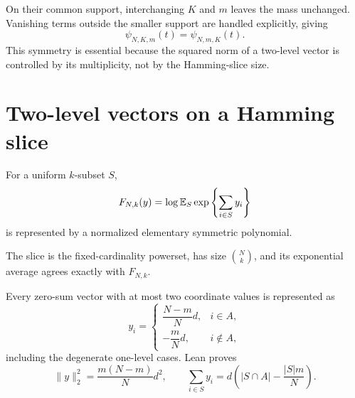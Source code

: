 \begin{lemma}
\label{lem:hypergeom-symmetry}
On their common support, interchanging \(K\) and \(m\) leaves the mass
unchanged.  Vanishing terms outside the smaller support are handled explicitly,
giving
\[
  \psi_{N,K,m}(t)=\psi_{N,m,K}(t).
\]
This symmetry is essential because the squared norm of a two-level vector is
controlled by its multiplicity, not by the Hamming-slice size.
\end{lemma}

\section{Two-level vectors on a Hamming slice}

\begin{definition}
For a uniform \(k\)-subset \(S\),
\[
  F_{N,k}(y)=\log\mathbb{E}_S\exp\left\{\sum_{i\in S}y_i\right\}
\]
is represented by a normalized elementary symmetric polynomial.
\end{definition}

\begin{lemma}
The slice is the fixed-cardinality powerset, has size \(\binom Nk\), and its
exponential average agrees exactly with \(F_{N,k}\).
\end{lemma}

\begin{lemma}
\label{lem:two-level-representation}
Every zero-sum vector with at most two coordinate values is represented as
\[
  y_i=\begin{cases}
    \dfrac{N-m}{N}d,&i\in A,\\[4pt]
    -\dfrac mN d,&i\notin A,
  \end{cases}
\]
including the degenerate one-level cases.  Lean proves
\[
  \|y\|_2^2=\frac{m(N-m)}N d^2,
  \qquad
  \sum_{i\in S}y_i=d\left(|S\cap A|-\frac{|S|m}{N}\right).
\]
\end{lemma}

